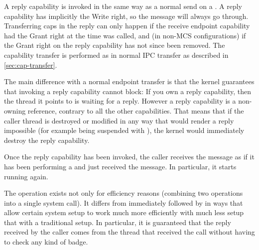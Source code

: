 A reply capability is invoked in the same way as a normal send on a
. A reply capability has implicitly the Write right, so the
message will always go through. Transferring caps in the reply can only happen
if the receive endpoint capability had the Grant right at the time
 was called, and (in non-MCS configurations) if the Grant
right on the reply capability has not since been removed. The capability
transfer is performed as in normal IPC transfer as described in
\autoref{sec:cap-transfer}.

The main difference with a normal endpoint transfer is that the kernel guarantees
that invoking a reply capability cannot block: If you own a reply capability,
then the thread it points to is waiting for a reply. However a reply capability
is a non-owning reference, contrary to all the other capabilities. That means that
if the caller thread is destroyed or modified in any way that would render
a reply impossible (for example being suspended with
), the kernel would immediately destroy
the reply capability.

Once the reply capability has been invoked, the caller receives the message as if
it has been performing a  and just received the
message. In particular, it starts running again.

The  operation exists not only for
efficiency reasons (combining two operations into a single system
call). It differs from
 immediately followed by
 in ways that allow certain system setup to work
much more efficiently with much less setup that with a traditional setup.
In particular, it is guaranteed that the reply received by the caller comes from
the thread that received the call without having to check any kind of badge.
